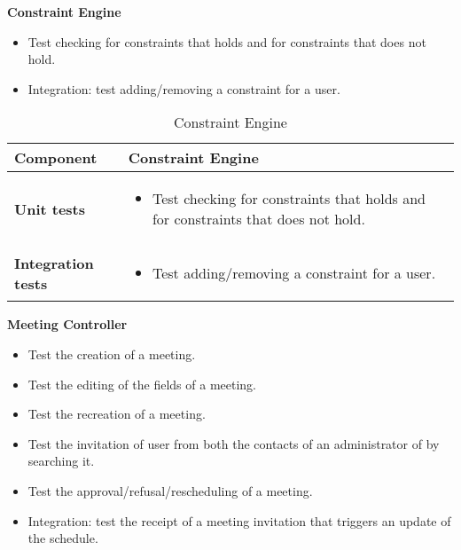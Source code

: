 \textbf{Constraint Engine}

\begin{itemize}
\item Test checking for constraints that holds and for constraints that does not hold.
\item Integration: test adding/removing a constraint for a user.
\end{itemize}

\begin{table}[H]	
	\centering
	\def\arraystretch{1.5}
	\begin{tabular}{|m{4cm}|m{12cm}|}
		\hline
		\textbf{Component} & Constraint Engine \\ \hline
		\textbf{Unit tests} & 
			\begin{itemize}
			\item Test checking for constraints that holds and for constraints that does not hold.
			\end{itemize} \\ \hline
		\textbf{Integration tests} & 
			\begin{itemize}
			\item Test adding/removing a constraint for a user.
			\end{itemize} \\ \hline
	\end{tabular}
	\caption{Constraint Engine}
\end{table}

\textbf{Meeting Controller}

\begin{itemize}
\item Test the creation of a meeting.
\item Test the editing of the fields of a meeting.
\item Test the recreation of a meeting.
\item Test the invitation of user from both the contacts of an administrator of by searching it.
\item Test the approval/refusal/rescheduling of a meeting.
\item Integration: test the receipt of a meeting invitation that triggers an update of the schedule.
\end{itemize}

